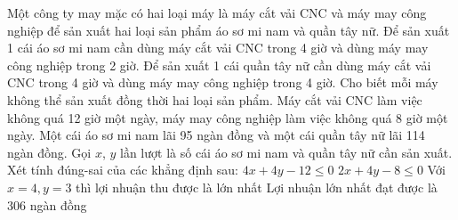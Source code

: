 \begin{ex}
 Một công ty may mặc có hai loại máy là máy cắt vải CNC và máy may công nghiệp để sản xuất hai loại sản phẩm áo sơ mi nam và quần tây nữ. Để sản xuất 1 cái áo sơ mi nam cần dùng máy cắt vải CNC trong 4 giờ và dùng máy may công nghiệp trong 2 giờ. Để sản xuất 1 cái quần tây nữ cần dùng máy cắt vải CNC trong 4 giờ và dùng máy may công nghiệp trong 4 giờ. Cho biết mỗi máy không thể sản xuất đồng thời hai loại sản phẩm. Máy cắt vải CNC làm việc không quá 12 giờ một ngày, máy may công nghiệp làm việc không quá 8 giờ một ngày. Một cái áo sơ mi nam lãi 95 ngàn đồng và một cái quần tây nữ lãi 114 ngàn đồng. Gọi $x$, $y$ lần lượt là số cái áo sơ mi nam và quần tây nữ cần sản xuất. Xét tính đúng-sai của các khẳng định sau:
\choiceTFt
{ \True  $4 x + 4 y - 12 \le 0$ }
   { \True  $2 x + 4 y - 8 \le 0$ }
     { Với $x = 4, y = 3$ thì lợi nhuận thu được là lớn nhất }
    { Lợi nhuận lớn nhất đạt được là 306 ngàn đồng  }
\end{ex}

